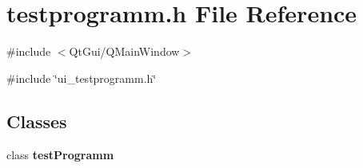 \section{testprogramm.h File Reference}
\label{testprogramm_8h}
{\ttfamily \#include $<$QtGui/QMainWindow$>$}\par
{\ttfamily \#include \char`\"{}ui\_\-testprogramm.h\char`\"{}}\par
\subsection*{Classes}
\begin{DoxyCompactItemize}
\item 
class {\bf testProgramm}
\end{DoxyCompactItemize}
